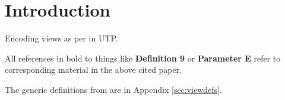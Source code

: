 \section{Introduction}

Encoding views as per \cite{conf/popl/Dinsdale-YoungBGPY13}
in UTP.

All references in bold to things
like \textbf{Definition 9} or \textbf{Parameter E} refer to corresponding material
in the above cited paper.

The generic definitions from\cite{conf/popl/Dinsdale-YoungBGPY13}
are in Appendix \ref{sec:viewdefs}.
